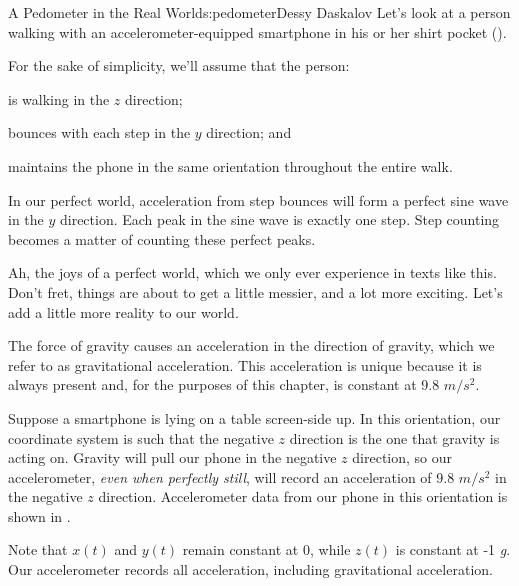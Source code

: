 \begin{aosachapter}{A Pedometer in the Real World}{s:pedometer}{Dessy Daskalov}
Let's look at a person walking with an accelerometer-equipped smartphone
in his or her shirt pocket ().


For the sake of simplicity, we'll assume that the person:

\begin{aosaitemize}

\item
  is walking in the $z$ direction;
\item
  bounces with each step in the $y$ direction; and
\item
  maintains the phone in the same orientation throughout the entire
  walk.
\end{aosaitemize}

In our perfect world, acceleration from step bounces will form a perfect
sine wave in the $y$ direction. Each peak in the sine wave is exactly
one step. Step counting becomes a matter of counting these perfect
peaks.

Ah, the joys of a perfect world, which we only ever experience in texts
like this. Don't fret, things are about to get a little messier, and a
lot more exciting. Let's add a little more reality to our world.

\label{even-perfect-worlds-have-fundamental-forces-of-nature}

The force of gravity causes an acceleration in the direction of gravity,
which we refer to as gravitational acceleration. This acceleration is
unique because it is always present and, for the purposes of this
chapter, is constant at 9.8 $m/s^2$.

Suppose a smartphone is lying on a table screen-side up. In this
orientation, our coordinate system is such that the negative $z$
direction is the one that gravity is acting on. Gravity will pull our
phone in the negative $z$ direction, so our accelerometer, \emph{even
when perfectly still}, will record an acceleration of 9.8 $m/s^2$ in the
negative $z$ direction. Accelerometer data from our phone in this
orientation is shown in
.


Note that $x(t)$ and $y(t)$ remain constant at 0, while $z(t)$ is
constant at -1 \emph{g}. Our accelerometer records all acceleration,
including gravitational acceleration.


\end{aosachapter}
